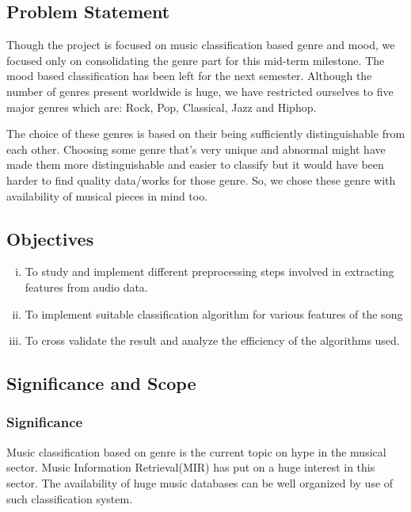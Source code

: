 \subsection{Problem Statement}
Though the project is focused on music classification based genre and mood, we focused only on consolidating the genre part for this mid-term
milestone. The mood based classification has been left for the next semester. Although the number of genres present worldwide is huge, we have
restricted ourselves to five major genres which are: Rock, Pop, Classical, Jazz and Hiphop.\\ 
\par The choice of these genres is based on their being sufficiently distinguishable from each other. Choosing some genre that’s very unique and
abnormal might have made them more distinguishable and easier to classify but it would have been harder to find quality data/works for those genre.
So, we chose these genre with availability of musical pieces in mind too.

\subsection{Objectives}
\begin{enumerate}[i.)]
        \item To study and implement different preprocessing steps involved in extracting features from audio data.
        \item To implement suitable classification algorithm for various features of the song
        \item To cross validate the result and analyze the efficiency of the algorithms used.
\end{enumerate}

\subsection{Significance and Scope}

\subsubsection{Significance}
Music classification based on genre is the current topic on hype in the musical sector. Music Information Retrieval(MIR) has put on a huge interest
in this sector. The availability of huge music databases can be well organized by use of such classification system. 

